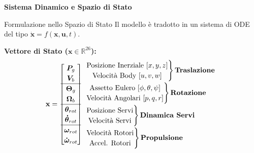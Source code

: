 \documentclass[aspectratio=169]{beamer} %
\begin{document}
\begin{frame}
    \vfill
    \centering
    {\Huge \textbf{Sistema Dinamico e Spazio di Stato}}
    \vfill
\end{frame}

\begin{frame}{Formulazione nello Spazio di Stato}
    Il modello è tradotto in un sistema di ODE del tipo $\dot{\mathbf{x}} = f(\mathbf{x}, \mathbf{u}, t)$.
    
    \vspace{0.5cm}
    \textbf{Vettore di Stato ($\mathbf{x} \in \mathbb{R}^{26}$):}
    \begin{equation}
        \mathbf{x} = 
        {
            \renewcommand{\arraystretch}{1.2}
        \begin{bmatrix}
            \bm{P}_g \\ \bm{V}_b \\ \hline
            \bm{\Theta}_g \\ \bm{\Omega}_b \\ \hline
            \bm{\theta}_{rot} \\ \bm{\dot{\theta}}_{rot} \\ \hline
            \bm{\omega}_{rot} \\ \bm{\dot{\omega}}_{rot}
        \end{bmatrix}
        }
        \begin{array}{l}
            \left. \begin{matrix} \text{Posizione Inerziale } [x,y,z] \\ \text{Velocità Body } [u,v,w] \end{matrix} \right\} \text{\textbf{Traslazione}} \\[1em]
            \left. \begin{matrix} \text{Assetto Eulero } [\phi,\theta,\psi] \\ \text{Velocità Angolari } [p,q,r] \end{matrix} \right\} \text{\textbf{Rotazione}} \\[1em]
            \left. \begin{matrix} \text{Posizione Servi} \\ \text{Velocità Servi} \end{matrix} \right\} \text{\textbf{Dinamica Servi}} \\[1em]
            \left. \begin{matrix} \text{Velocità Rotori} \\ \text{Accel. Rotori} \end{matrix} \right\} \text{\textbf{Propulsione}}
        \end{array}
    \end{equation}
\end{frame}
\end{document}
